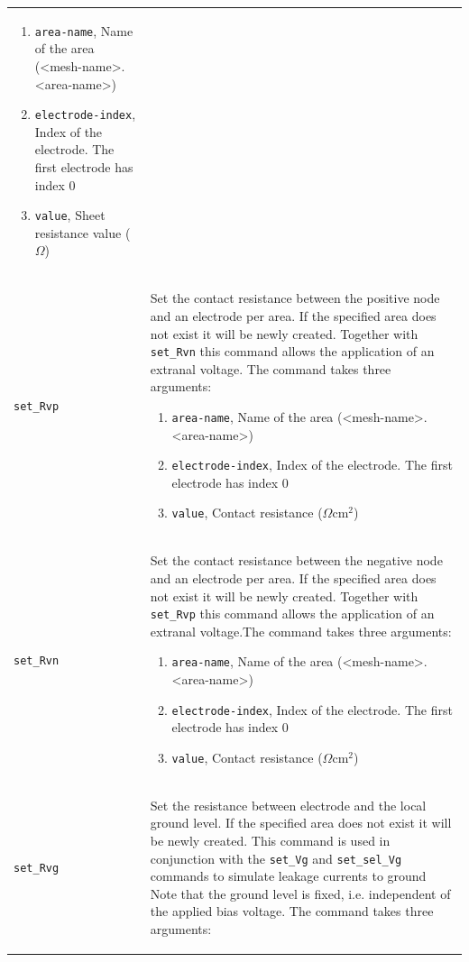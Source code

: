 \documentclass[noshowpacs,preprintnumbers,amsmath,amssymb, letter]{revtex4}
\begin{document}
\begin{longtable}{p{}p{}}
\begin{enumerate}
\item \texttt{area-name}, Name of the area (\textless mesh-name\textgreater .\textless area-name\textgreater )
\item \texttt{electrode-index}, Index of the electrode. The first electrode has index 0
\item \texttt{value}, Sheet resistance value ($\Omega$)
\end{enumerate}\\
\texttt{set\_Rvp}	&  Set the contact resistance between the positive node and an electrode per area. If the specified area does not exist it will be newly created. Together with \texttt{set\_Rvn} this command allows the application of an extranal voltage. The command takes three arguments:
\begin{enumerate}
\item \texttt{area-name}, Name of the area (\textless mesh-name\textgreater .\textless area-name\textgreater )
\item \texttt{electrode-index}, Index of the electrode. The first electrode has index 0
\item \texttt{value}, Contact resistance ($\Omega \text{cm}^2$)
\end{enumerate}\\
\texttt{set\_Rvn}	&  Set the contact resistance between the negative node and an electrode per area. If the specified area does not exist it will be newly created. Together with \texttt{set\_Rvp} this command allows the application of an extranal voltage.The command takes three arguments:
\begin{enumerate}
\item \texttt{area-name}, Name of the area (\textless mesh-name\textgreater .\textless area-name\textgreater )
\item \texttt{electrode-index}, Index of the electrode. The first electrode has index 0
\item \texttt{value}, Contact resistance ($\Omega \text{cm}^2$)
\end{enumerate}\\
\texttt{set\_Rvg}	&  Set the resistance between electrode and the local ground level. If the specified area does not exist it will be newly created. This command is used in conjunction with the \texttt{set\_Vg} and \texttt{set\_sel\_Vg} commands to simulate leakage currents to ground  Note that the ground level is fixed, i.e. independent of the applied bias voltage. The command takes three arguments:
\begin{enumerate}

\end{enumerate}
\end{longtable}
\end{document}
